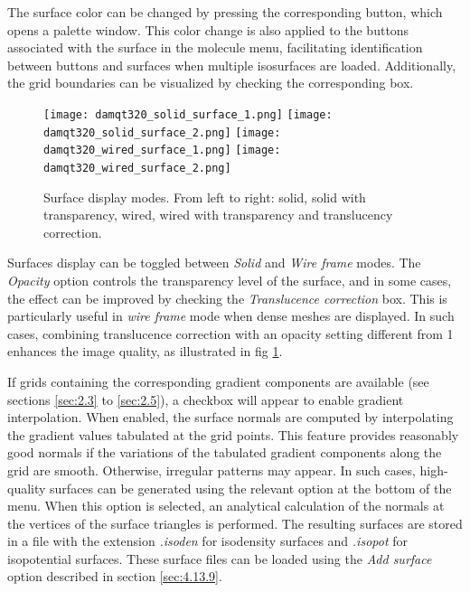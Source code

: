 \documentclass[10pt]{article}
\begin{document}
The surface color can be changed by pressing the 
corresponding button, which opens a palette window. This color change is also applied 
to the buttons associated with the surface in the molecule menu, facilitating
identification between buttons and surfaces when multiple isosurfaces are loaded.
Additionally, the grid boundaries can be visualized by checking the corresponding box.


\begin{figure}[H]
    \begin{center}
        \texttt{[image: damqt320\_solid\_surface\_1.png]}
        \hspace*{3mm}
        \texttt{[image: damqt320\_solid\_surface\_2.png]}
        \hspace*{3mm}
        \texttt{[image: damqt320\_wired\_surface\_1.png]}
        \hspace*{3mm}
        \texttt{[image: damqt320\_wired\_surface\_2.png]}
    \end{center}
    \vspace*{0.5mm}
    \caption[Surface display modes]{Surface display modes. From left to right: solid,
    solid with transparency, wired, wired with transparency and translucency correction.
    \label{fig:4_13_10_3}}
\end{figure}

\vspace*{5mm}

Surfaces display can be toggled between {\it Solid} and {\it Wire frame} modes. 
The {\it Opacity}
option controls the transparency level of the surface, and in some cases, the effect
can be improved by checking the {\it Translucence correction} box. This is particularly useful
in {\it wire frame} mode when dense meshes are displayed. In such cases, combining translucence correction with an opacity setting different from 1 enhances the image quality, as illustrated in fig \ref{fig:4_13_10_3}.

If grids containing the corresponding gradient components are available (see sections \ref{sec:2.3}
to \ref{sec:2.5}), a checkbox will appear to enable gradient interpolation. When enabled,
the surface normals are computed by interpolating the gradient values tabulated at the grid points.
This feature provides reasonably good normals if the variations
of the tabulated gradient components along the grid are smooth. Otherwise, irregular patterns may
appear. In such cases, high-quality 
surfaces can be generated 
using the relevant option at the bottom of the menu. When this option is selected,
an analytical calculation of the normals 
at the vertices of the surface triangles is performed.
The resulting surfaces are stored in a file with the extension 
{\it .isoden} for isodensity surfaces
and {\it .isopot} for isopotential surfaces. 
These surface files can be loaded using the {\it Add surface} option
described in section \ref{sec:4.13.9}.
\end{document}

